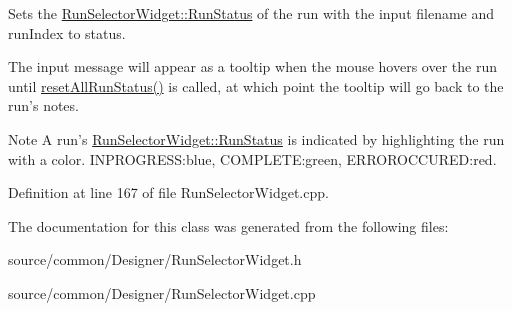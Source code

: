Sets the \hyperlink{class_picto_1_1_run_selector_widget_ac540ab59a379b3bfb5534ecde54dc2aa}{Run\-Selector\-Widget\-::\-Run\-Status} of the run with the input filename and run\-Index to status. 

The input message will appear as a tooltip when the mouse hovers over the run until \hyperlink{class_picto_1_1_run_selector_widget_a8c21deac73e7d1887abf0c13392fc465}{reset\-All\-Run\-Status()} is called, at which point the tooltip will go back to the run's notes. \begin{DoxyNote}{Note}
A run's \hyperlink{class_picto_1_1_run_selector_widget_ac540ab59a379b3bfb5534ecde54dc2aa}{Run\-Selector\-Widget\-::\-Run\-Status} is indicated by highlighting the run with a color. I\-N\-P\-R\-O\-G\-R\-E\-S\-S\-:blue, C\-O\-M\-P\-L\-E\-T\-E\-:green, E\-R\-R\-O\-R\-O\-C\-C\-U\-R\-E\-D\-:red. 
\end{DoxyNote}


Definition at line 167 of file Run\-Selector\-Widget.\-cpp.



The documentation for this class was generated from the following files\-:\begin{DoxyCompactItemize}
\item 
source/common/\-Designer/Run\-Selector\-Widget.\-h\item 
source/common/\-Designer/Run\-Selector\-Widget.\-cpp\end{DoxyCompactItemize}
